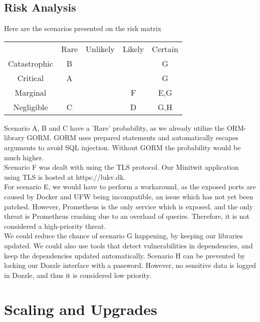 \subsection{Risk Analysis}
Here are the scenarios presented on the risk matrix\\
\begin{center}
\begin{tabular}{ |c|c|c|c|c| } 
 \hline
  & Rare & Unlikely & Likely & Certain \\ 
 Catastrophic & B &  &  & G\\ 
 Critical & A &  &  & G \\ 
 Marginal & &  &  F& E,G\\ 
 Negligible & C &  & D & G,H\\ 
 \hline
\end{tabular}
\end{center}

Scenario A, B and C have a 'Rare' probability, as we already utilize the ORM-library GORM. GORM uses prepared statements and automatically escapes arguments to avoid SQL injection. Without GORM the probability would be much higher. \\
Scenario F was dealt with using the TLS protocol. Our Minitwit application using TLS is hosted at https://lukv.dk. \\

For scenario E, we would have to perform a workaround, as the exposed ports are caused by Docker and UFW being incompatible, an issue which has not yet been patched. However, Prometheus is the only service which is exposed, and the only threat is Prometheus crashing due to an overload of queries. Therefore, it is not considered a high-priority threat.\\
We could reduce the chance of scenario G happening, by keeping our libraries updated. We could also use tools that detect vulnerabilities in dependencies, and keep the dependencies updated automatically. 
Scenario H can be prevented by locking our Dozzle interface with a password. However, no sensitive data is logged in Dozzle, and thus it is considered low priority.

\section{Scaling and Upgrades}
